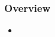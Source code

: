 %
%
%
%


\begin{frame}[fragile]
%
  \frametitle{Overview}
%
  \begin{itemize}
%
  \item
% 
  \end{itemize}
%
\end{frame}

